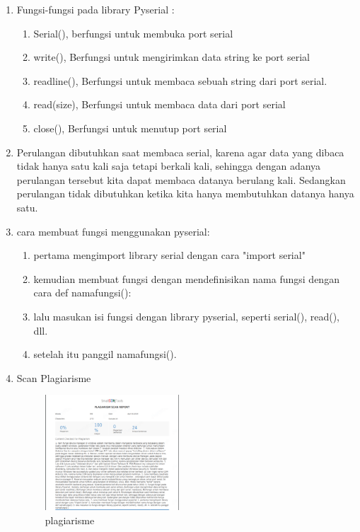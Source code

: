 \begin{enumerate}
    \item Fungsi-fungsi pada library Pyserial :
    \begin{enumerate}
        \item Serial(), berfungsi untuk membuka port serial
        \item write(), Berfungsi untuk mengirimkan data string ke port serial
        \item readline(), Berfungsi untuk membaca sebuah string dari port serial. 
        \item read(size), Berfungsi untuk membaca data dari port serial
        \item close(), Berfungsi untuk menutup port serial
    \end{enumerate}
    \item Perulangan dibutuhkan saat membaca serial, karena agar data yang dibaca tidak hanya satu kali saja tetapi berkali kali, sehingga dengan adanya perulangan tersebut kita dapat membaca datanya berulang kali. Sedangkan perulangan tidak dibutuhkan ketika kita hanya membutuhkan datanya hanya satu. 
    \item cara membuat fungsi menggunakan pyserial:
    \begin{enumerate}
        \item pertama mengimport library serial dengan cara "import serial"
        \item kemudian membuat fungsi dengan mendefinisikan nama fungsi dengan cara def namafungsi():
        \item lalu masukan isi fungsi dengan library pyserial, seperti serial(), read(), dll.
        \item setelah itu panggil namafungsi().
    \end{enumerate}
    \item Scan Plagiarisme
    \begin{figure}[ht!]
    \includegraphics[width=5cm]{figures/5/1174084/Teori/c5_1.png}
    \centering
    \caption{plagiarisme}
    \end{figure}

\end{enumerate}

